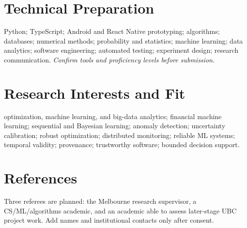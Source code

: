 \documentclass[11pt]{article}
\begin{document}
\section*{Technical Preparation}
Python; TypeScript; Android and React Native prototyping; algorithms; databases; numerical methods; probability and statistics; machine learning; data analytics; software engineering; automated testing; experiment design; research communication. \textit{Confirm tools and proficiency levels before submission.}

\section*{Research Interests and Fit}
optimization, machine learning, and big-data analytics; financial machine learning; sequential and Bayesian learning; anomaly detection; uncertainty calibration; robust optimization; distributed monitoring; reliable ML systems; temporal validity; provenance; trustworthy software; bounded decision support.

\section*{References}
Three referees are planned: the Melbourne research supervisor, a CS/ML/algorithms academic, and an academic able to assess later-stage UBC project work. Add names and institutional contacts only after consent.
\end{document}
